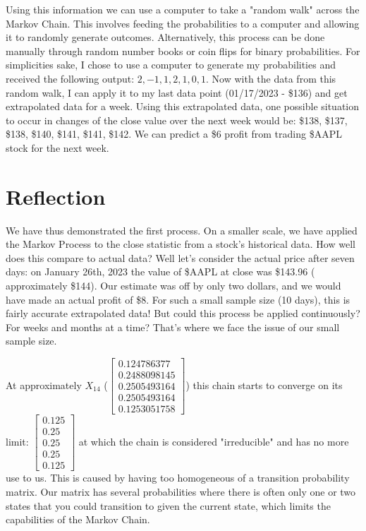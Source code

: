 \documentclass[12pt,final]{article}
\begin{document}
Using this information we can use a computer to take a "random walk" across the Markov Chain. This involves
feeding the probabilities to a computer and allowing it to randomly generate outcomes. Alternatively, this
process can be done manually through random number books or coin flips for binary probabilities. For
simplicities sake, I chose to use a computer to generate my probabilities and received the following output:
$2, -1, 1, 2, 1, 0, 1$. Now with the data from this random walk, I can apply it to my last data point
(01/17/2023 - \$136) and get extrapolated data for a week. Using this extrapolated data, one possible
situation to occur in changes of the close value over the next week would be: \$138, \$137, \$138, \$140,
\$141, \$141, \$142. We can predict a \$6 profit from trading \$AAPL stock for the next week.

\section{Reflection}

We have thus demonstrated the first process. On a smaller scale, we have applied the Markov Process to the
close statistic from a stock's historical data. How well does this compare to actual data? Well let's consider
the actual price after seven days: on January 26th, 2023 the value of \$AAPL at close was \$143.96 (
approximately \$144). Our estimate was off by only two dollars, and we would have made an actual profit of \$8.
For such a small sample size (10 days), this is fairly accurate extrapolated data! But could this process be
applied continuously? For weeks and months at a time? That's where we face the issue of our small sample size.

At approximately $X_{14}$
($\begin{bmatrix} 0.124786377 \\ 0.2488098145 \\ 0.2505493164 \\ 0.2505493164 \\ 0.1253051758 \end{bmatrix}$)
this chain starts to converge on its limit:
$\begin{bmatrix} 0.125 \\ 0.25 \\ 0.25 \\ 0.25 \\ 0.125 \end{bmatrix}$ at which the chain is considered
"irreducible" and has no more use to us. This is caused by having too homogeneous of a transition probability
matrix. Our matrix has several probabilities where there is often only one or two states that you could
transition to given the current state, which limits the capabilities of the Markov Chain.
\end{document}
